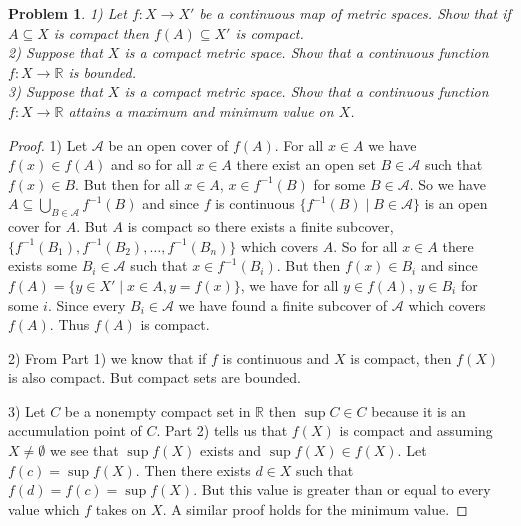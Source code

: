 \documentclass{article}
\newtheorem{problem}{Problem}
\begin{document}
\begin{flushleft}
\begin{problem}
1) Let $f : X \rightarrow X'$ be a continuous map of metric spaces. Show that if $A \subseteq X$ is compact then $f(A) \subseteq X'$ is compact.\\
2) Suppose that $X$ is a compact metric space. Show that a continuous function $f : X \rightarrow \mathbb{R}$ is bounded.\\
3) Suppose that $X $ is a compact metric space. Show that a continuous function $f : X \rightarrow \mathbb{R}$ attains a maximum and minimum value on $X$.
\end{problem}
\begin{proof}
1) Let $\mathcal{A}$ be an open cover of $f(A)$. For all $x \in A$ we have $f(x) \in f(A)$ and so for all $x \in A$ there exist an open set $B \in \mathcal{A}$ such that $f(x) \in B$. But then for all $x \in A$, $x \in f^{-1}(B)$ for some $B \in \mathcal{A}$. So we have $A \subseteq \bigcup_{B \in \mathcal{A}} f^{-1}(B)$ and since $f$ is continuous $\{f^{-1}(B) \mid B \in \mathcal{A}\}$ is an open cover for $A$. But $A$ is compact so there exists a finite subcover, $\{f^{-1}(B_1), f^{-1}(B_2), \dots , f^{-1}(B_n)\}$ which covers $A$. So for all $x \in A$ there exists some $B_i \in \mathcal{A}$ such that $x \in f^{-1}(B_i)$. But then $f(x) \in B_i$ and since $f(A) = \{ y \in X' \mid x \in A, y=f(x) \}$, we have for all $y \in f(A)$, $y \in B_i$ for some $i$. Since every $B_i \in \mathcal{A}$ we have found a finite subcover of $\mathcal{A}$ which covers $f(A)$. Thus $f(A)$ is compact.\newline

2) From Part 1) we know that if $f$ is continuous and $X$ is compact, then $f(X)$ is also compact. But compact sets are bounded.\newline

3) Let $C$ be a nonempty compact set in $\mathbb{R}$ then $\sup C \in C$ because it is an accumulation point of $C$. Part 2) tells us that $f(X)$ is compact and assuming $X \neq \emptyset$ we see that $\sup f(X)$ exists and $\sup f(X) \in f(X)$. Let $f(c) = \sup f(X)$. Then there exists $d \in X$ such that $f(d) = f(c) = \sup f(X)$. But this value is greater than or equal to every value which $f$ takes on $X$. A similar proof holds for the minimum value.
\end{proof}



\end{flushleft}
\end{document}
